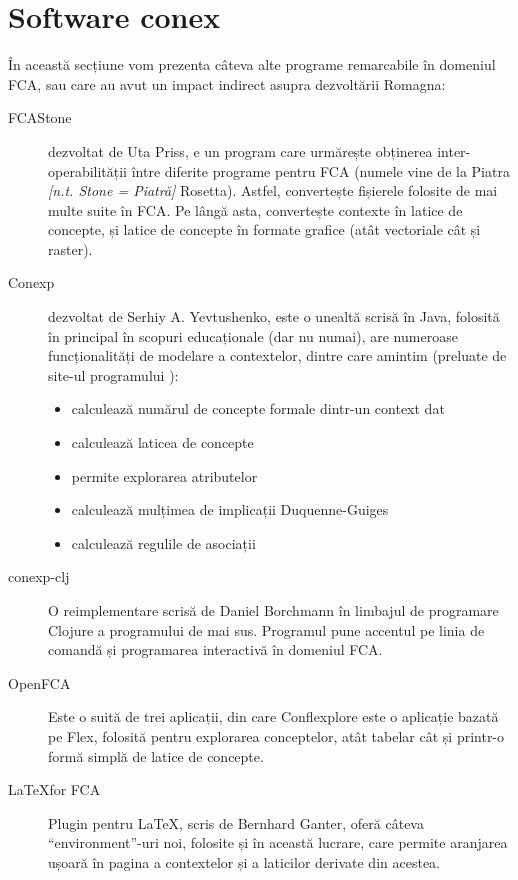 \documentclass[12pt, a4paper, twoside, romanian]{teza-upb}
\begin{document}
  \section{Software conex}

    În această secțiune vom prezenta câteva alte programe remarcabile în domeniul FCA, sau care au avut un impact indirect asupra dezvoltării Romagna:
    \begin{description}
      \item[FCAStone] dezvoltat de Uta Priss, e un program care urmărește obținerea inter-operabilității între diferite programe pentru FCA (numele vine de la Piatra \textit{[n.t. Stone = Piatră]} Rosetta). Astfel, convertește fișierele folosite de mai multe suite în FCA. Pe lângă asta, convertește contexte în latice de concepte, și latice de concepte în formate grafice (atât vectoriale cât și raster).
      \item[Conexp] dezvoltat de Serhiy A. Yevtushenko, este o unealtă scrisă în Java, folosită în principal în scopuri educaționale (dar nu numai), are numeroase funcționalități de modelare a contextelor, dintre care amintim (preluate de site-ul programului \cite{conexp:users}):
        \begin{itemize}
            \item calculează numărul de concepte formale dintr-un context dat
            \item calculează laticea de concepte
            \item permite explorarea atributelor
            \item calculează mulțimea de implicații Duquenne-Guiges
            \item calculează regulile de asociații
        \end{itemize}
      \item[conexp-clj] O reimplementare scrisă de Daniel Borchmann în limbajul de programare Clojure a programului de mai sus. Programul pune accentul pe linia de comandă și programarea interactivă în domeniul FCA.
      \item[OpenFCA] Este o suită de trei aplicații, din care Conflexplore este o aplicație bazată pe Flex, folosită pentru explorarea conceptelor, atât tabelar cât și printr-o formă simplă de latice de concepte.  
      \item[\LaTeX for FCA] \cite{LatexForFCA:homepage} Plugin pentru \LaTeX, scris de Bernhard Ganter, oferă câteva ``environment''-uri noi, folosite și în această lucrare, care permite aranjarea ușoară în pagina a contextelor și a laticilor derivate din acestea.
    \end{description}
\end{document}
